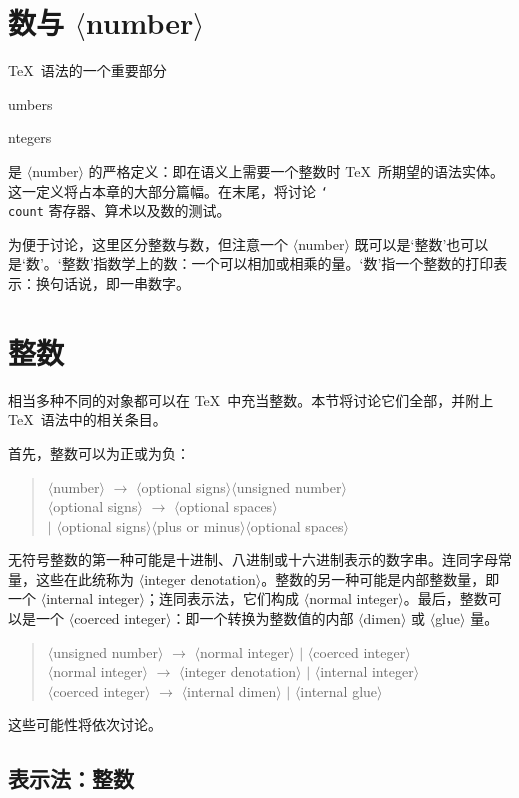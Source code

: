 \documentclass[a4paper]{rapport3}
\def\nl{\protect\\}\def\n#1{{\tt #1}}\def\cs#1{{\tt\char`\\#1}}\let\csc\cs
\def\gr#1{$\langle$#1$\rangle$}\def\key#1{{\tt#1}}
\newenvironment{disp}{\begin{quotation}}{\end{quotation}}
\def\term#1\par{\index{#1}}
\begin{document}
\section{数与 \gr{number}}

\TeX\ 语法的一个重要部分
\term numbers\par\term integers\par
是 \gr{number} 的严格定义：即在语义上需要一个整数时 \TeX\ 所期望的语法实体。这一定义将占本章的大部分篇幅。在末尾，将讨论 \cs{count} 寄存器、算术以及数的测试。

为便于讨论，这里区分整数与数，但注意一个 \gr{number} 既可以是`整数'也可以是`数'。`整数'指数学上的数：一个可以相加或相乘的量。`数'指一个整数的打印表示：换句话说，即一串数字。

\section{整数}

相当多种不同的对象都可以在 \TeX\ 中充当整数。本节将讨论它们全部，并附上 \TeX\ 语法中的相关条目。
\awp

首先，整数可以为正或为负：
\begin{disp}\gr{number} $\longrightarrow$
\gr{optional signs}\gr{unsigned number}\nl
\gr{optional signs} $\longrightarrow$ \gr{optional spaces}\nl
\indent $|$ \gr{optional signs}\gr{plus or minus}\gr{optional spaces}
\end{disp}

无符号整数的第一种可能是十进制、八进制或十六进制表示的数字串。连同字母常量，这些在此统称为 \gr{integer denotation}。整数的另一种可能是内部整数量，即一个 \gr{internal integer}；连同表示法，它们构成 \gr{normal integer}。最后，整数可以是一个 \gr{coerced integer}：即一个转换为整数值的内部 \gr{dimen} 或 \gr{glue} 量。
\begin{disp}\gr{unsigned number} $\longrightarrow$ \gr{normal integer}
$|$ \gr{coerced integer}\nl
\gr{normal integer} $\longrightarrow$ \gr{integer denotation}
$|$ \gr{internal integer}\nl
\gr{coerced integer} $\longrightarrow$ \gr{internal dimen}
$|$ \gr{internal glue}\end{disp}
这些可能性将依次讨论。


\subsection{表示法：整数}
\label{int:denotation}
\end{document}
